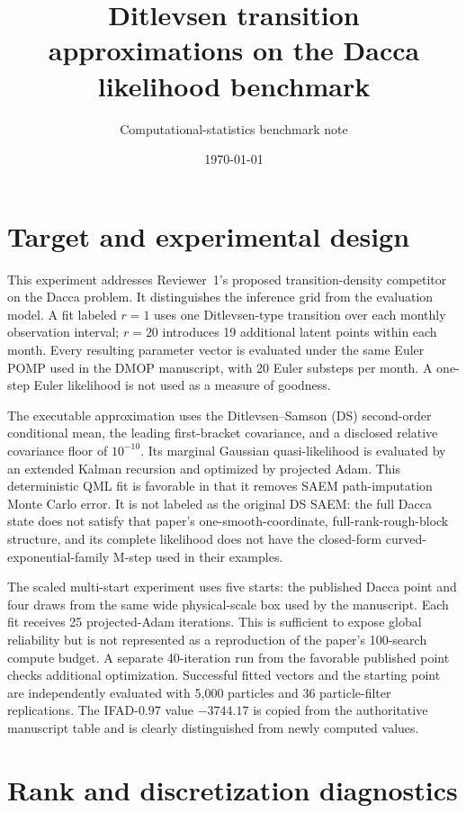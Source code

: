 \documentclass[11pt]{article}
\title{Ditlevsen transition approximations on the Dacca likelihood benchmark}
\author{Computational-statistics benchmark note}
\date{\today}
\begin{document}
\maketitle

\section{Target and experimental design}

This experiment addresses Reviewer~1's proposed transition-density competitor
on the Dacca problem.  It distinguishes the inference grid from the evaluation
model.  A fit labeled $r=1$ uses one Ditlevsen-type transition over each monthly
observation interval; $r=20$ introduces 19 additional latent points within
each month.  Every resulting parameter vector is evaluated under the same
Euler POMP used in the DMOP manuscript, with 20 Euler substeps per month.  A
one-step Euler likelihood is not used as a measure of goodness.

The executable approximation uses the Ditlevsen--Samson (DS) second-order
conditional mean, the leading first-bracket covariance, and a disclosed
relative covariance floor of $10^{-10}$.  Its marginal Gaussian
quasi-likelihood is evaluated by an extended Kalman recursion and optimized by
projected Adam.  This deterministic QML fit is favorable in that it removes
SAEM path-imputation Monte Carlo error.  It is not labeled as the original DS
SAEM: the full Dacca state does not satisfy that paper's one-smooth-coordinate,
full-rank-rough-block structure, and its complete likelihood does not have the
closed-form curved-exponential-family M-step used in their examples.

The scaled multi-start experiment uses five starts: the published Dacca point
and four draws from the same wide physical-scale box used by the manuscript.
Each fit receives 25 projected-Adam iterations.  This is sufficient to expose
global reliability but is not represented as a reproduction of the paper's
100-search compute budget.  A separate 40-iteration run from the favorable
published point checks additional optimization.  Successful fitted vectors and
the starting point are independently evaluated with 5,000 particles and 36
particle-filter replications.  The IFAD-$0.97$ value
$-3744.17$ is copied from the authoritative manuscript table and is clearly
distinguished from newly computed values.

\section{Rank and discretization diagnostics}
\end{document}
